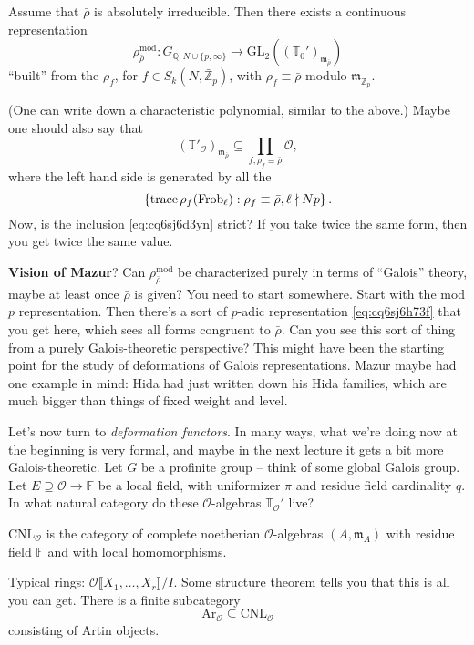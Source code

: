 \documentclass[reqno]{amsart} 
\begin{document}
\begin{theorem}
  Assume that $\bar{\rho}$ is absolutely irreducible.  Then there exists a continuous representation
  \begin{equation}\label{eq:cq6sj6h73f}
    \rho_{\bar{\rho}}^{\mathrm{mod}} : G_{\mathbb{Q}, N \cup \{p, \infty\}} \rightarrow \mathrm{GL}_2 \left((\mathbb{T}_0 ')_{\mathfrak{m}_{\bar{\rho}}} \right)
  \end{equation}
  ``built'' from the $\rho_f$, for $f \in S_k(N, \bar{\mathbb{Z}}_p)$, with $\rho_f \equiv \bar{\rho}$ modulo $\mathfrak{m}_{\bar{\mathbb{Z}}_p}$.
\end{theorem}
(One can write down a characteristic polynomial, similar to the above.)  Maybe one should also say that
\begin{equation}\label{eq:cq6sj6d3yn}
  \left( \mathbb{T} '_{\mathcal{O}} \right)_{\mathfrak{m}_{\bar{\rho}}} \subseteq \prod_{f, \rho_f \equiv \bar{\rho}} \mathcal{O},
\end{equation}
where the left hand side is generated by all the
\begin{equation*}
  \left\{ \operatorname{trace} \rho_f(\operatorname{Frob}_{\ell}) : \rho_f \equiv \bar{\rho}, \ell \nmid N p \right\}.
\end{equation*}
Now, is the inclusion \eqref{eq:cq6sj6d3yn} strict?  If you take twice the same form, then you get twice the same value.

\textbf{Vision of Mazur}?  Can $\rho_{\bar{\rho}}^{\mathrm{mod}}$ be characterized purely in terms of ``Galois'' theory, maybe at least once $\bar{\rho}$ is given?  You need to start somewhere.  Start with the mod $p$ representation.  Then there's a sort of $p$-adic representation \eqref{eq:cq6sj6h73f} that you get here, which sees all forms congruent to $\bar{\rho}$.  Can you see this sort of thing from a purely Galois-theoretic perspective?  This might have been the starting point for the study of deformations of Galois representations.  Mazur maybe had one example in mind: Hida had just written down his Hida families, which are much bigger than things of fixed weight and level.

Let's now turn to \emph{deformation functors}.  In many ways, what we're doing now at the beginning is very formal, and maybe in the next lecture it gets a bit more Galois-theoretic.  Let $G$ be a profinite group -- think of some global Galois group.  Let $E \supseteq \mathcal{O} \rightarrow \mathbb{F}$ be a local field, with uniformizer $\pi$ and residue field cardinality $q$.  In what natural category do these $\mathcal{O}$-algebras $\mathbb{T}_{\mathcal{O}}'$ live?
\begin{definition}
  $\mathrm{C N L }_{\mathcal{O}}$ is the category of complete noetherian $\mathcal{O}$-algebras $(A, \mathfrak{m}_{A})$ with residue field $\mathbb{F}$ and with local homomorphisms.
\end{definition}
Typical rings: $\mathcal{O} \llbracket X_1, \dotsc, X_r\rrbracket / I$.  Some structure theorem tells you that this is all you can get.  There is a finite subcategory
\begin{equation*}
  \mathrm{Ar}_{\mathcal{O}} \subseteq \mathrm{C N L}_{\mathcal{O}}
\end{equation*}
consisting of Artin objects.
\end{document}
